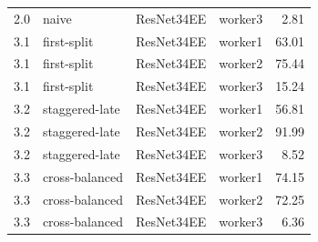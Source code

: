 \begin{table}
\begin{tabular}{llllr}
       2.0 &          naive & ResNet34EE & worker3 &              2.81 \\
       3.1 &    first-split & ResNet34EE & worker1 &             63.01 \\
       3.1 &    first-split & ResNet34EE & worker2 &             75.44 \\
       3.1 &    first-split & ResNet34EE & worker3 &             15.24 \\
       3.2 & staggered-late & ResNet34EE & worker1 &             56.81 \\
       3.2 & staggered-late & ResNet34EE & worker2 &             91.99 \\
       3.2 & staggered-late & ResNet34EE & worker3 &              8.52 \\
       3.3 & cross-balanced & ResNet34EE & worker1 &             74.15 \\
       3.3 & cross-balanced & ResNet34EE & worker2 &             72.25 \\
       3.3 & cross-balanced & ResNet34EE & worker3 &              6.36 \\
\bottomrule
\end{tabular}
\end{table}
